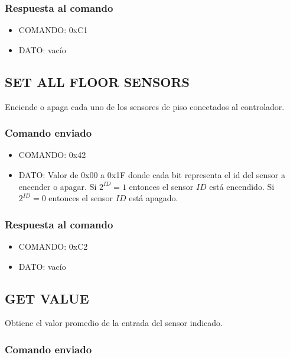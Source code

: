 \documentclass[a4paper,10pt]{article}
\begin{document}
\subsubsection*{Respuesta al comando}

\begin{itemize}
	\item{COMANDO:} 0xC1
	\item{DATO:} vac\'io
\end{itemize}

\subsection{SET ALL FLOOR SENSORS}
\label{set_all_fs}

Enciende o apaga cada uno de los sensores de piso conectados al controlador.

\subsubsection*{Comando enviado}

\begin{itemize}
	\item{COMANDO:} 0x42
	\item{DATO:} Valor de 0x00 a 0x1F donde cada bit representa el id del sensor a encender o apagar.
	Si $2^{ID} = 1$ entonces el sensor $ID$ est\'a encendido.
	Si $2^{ID} = 0$ entonces el sensor $ID$ est\'a apagado.
\end{itemize}

\subsubsection*{Respuesta al comando}

\begin{itemize}
	\item{COMANDO:} 0xC2
	\item{DATO:} vac\'io
\end{itemize}

\subsection{GET VALUE}
\label{get_value_fs}

Obtiene el valor promedio de la entrada del sensor indicado.

\subsubsection*{Comando enviado}
\end{document}
